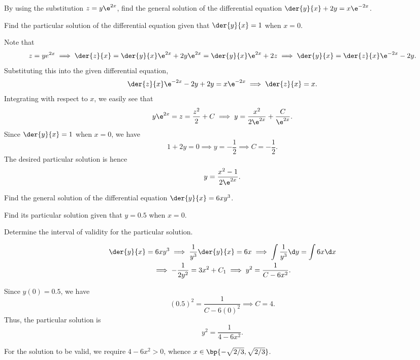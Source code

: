 \begin{problem}
    By using the substitution $z = y\e^{2x}$, find the general solution of the differential equation $\der{y}{x} + 2y = x\e^{-2x}$.

    Find the particular solution of the differential equation given that $\der{y}{x} = 1$ when $x = 0$.
\end{problem}
\begin{solution}
    Note that \[z = ye^{2x} \implies \der{z}{x} = \der{y}{x} \e^{2x} + 2y \e^{2x} = \der{y}{x} \e^{2x} + 2z \implies \der{y}{x} = \der{z}{x} \e^{-2x} - 2y.\] Substituting this into the given differential equation, \[\der{z}{x} \e^{-2x} - 2y + 2y = x \e^{-2x} \implies \der{z}{x} = x.\] Integrating with respect to $x$, we easily see that \[y \e^{2x} = z = \frac{z^2}{2} + C \implies y = \frac{x^2}{2 \e^{2x}} + \frac{C}{\e^{2x}}.\] Since $\der{y}{x} = 1$ when $x = 0$, we have \[1 + 2y = 0 \implies y = -\frac12 \implies C = -\frac12.\] The desired particular solution is hence \[y = \frac{x^2 - 1}{2\e^{2x}}.\]
\end{solution}

\begin{problem}
    Find the general solution of the differential equation $\der{y}{x} = 6xy^3$.

    Find its particular solution given that $y = 0.5$ when $x = 0$.

    Determine the interval of validity for the particular solution.
\end{problem}
\begin{solution}
    \begin{gather*}
        \der{y}{x} = 6xy^3 \implies \frac{1}{y^3} \der{y}{x} = 6x \implies \int \frac{1}{y^3} \d y = \int 6x \d  x\\
        \implies -\frac{1}{2y^2} = 3x^2 + C_1 \implies y^2 = \frac{1}{C - 6x^2}.
    \end{gather*}

    Since $y(0) = 0.5$, we have \[(0.5)^2 = \frac1{C - 6(0)^2} \implies C = 4.\] Thus, the particular solution is \[y^2 = \frac1{4 - 6x^2}.\]
 
    For the solution to be valid, we require $4 - 6x^2 > 0$, whence $x \in \bp{-\sqrt{2/3}, \sqrt{2/3}}$.
\end{solution}

